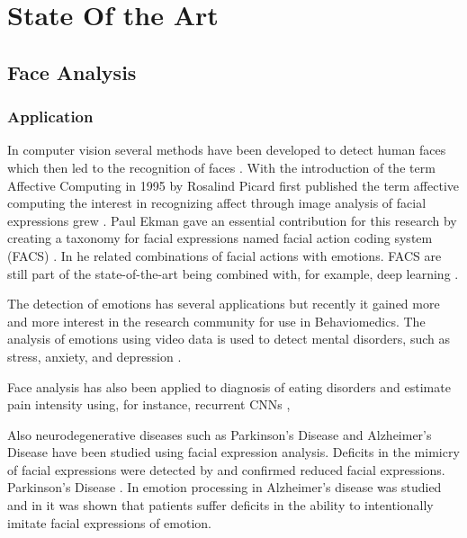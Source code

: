 \chapter{State Of the Art}
\label{cha:stateofart}
\acresetall


\section{Face Analysis}

\subsection{Application}

In computer vision several methods have been developed to detect human faces  which then led to the recognition of faces . With the introduction of the term Affective Computing in 1995 by Rosalind Picard first published the term affective computing the interest in recognizing affect through image analysis of facial expressions grew \cite{Huang2010}. Paul Ekman gave an essential contribution for this research by creating a taxonomy for facial expressions named facial action coding system (FACS) \cite{Ekman1977}. In \cite{Ekman1997} he related combinations of facial actions with emotions. FACS are still part of the state-of-the-art being combined with, for example, deep learning \cite{Jaiswal2016}.

The detection of emotions has several applications but recently it gained more and more interest in the research community for use in Behaviomedics\cite{Valstar2014automatic}. The analysis of emotions using video data is used to detect mental disorders, such as stress, anxiety, and depression \cite{Holt2016} \cite{Valstar2014automatic} \cite{Valstar2016avec}\cite{Valstar2014avec}. 

Face analysis has also been applied to diagnosis of eating disorders \cite{Leppanen2017} and estimate pain intensity \cite{Valstar2014automatic} using, for instance, recurrent CNNs \cite{Zhou2016}, 

Also neurodegenerative diseases such as Parkinson's Disease \cite{Almutiry2016} \cite{Bandini2017}\cite{Silverdale2016} and Alzheimer's Disease have been studied using facial expression analysis. Deficits in the mimicry of facial expressions were detected by \cite{Livingstone2016} and \cite{Ricciardi2015} confirmed reduced facial expressions.
Parkinson's Disease \cite{Almutiry2016} \cite{Bandini2017}. In \cite{Cadieux1997} 
emotion processing in Alzheimer's disease was studied and in \cite{Gola2017} it was shown that patients suffer deficits in the ability to intentionally imitate facial expressions of emotion.

